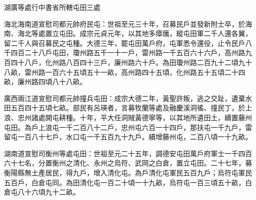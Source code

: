 \begin{pinyinscope}
 湖廣等處行中書省所轄屯田三處



 海北海南道宣慰司都元帥府民屯：世祖至元三十年，召募民戶並發新附士卒，於海南、海北等處置立屯田。成宗元貞元年，以其地多瘴癘，縱屯田軍二千人還各翼，留二千人與召募民之屯種。大德三年，罷屯田萬戶府，屯軍悉令還役，止令民戶八千四百二十八戶屯田，瓊州路五千一十一戶，雷州路一千五百六十六戶，高州路九百四十八戶，化州路八百四十三戶，廉州路六十戶。為田瓊州路二百九十二頃九十八畝，雷州路一百六十五頃五十一畝，高州路四十五頃，化州路五十五頃二十四畝，廉州路四頃八十八畝。



 廣西兩江道宣慰司都元帥撞兵屯田：成宗大德二年，黃聖許叛，逃之交趾，遺棄水田五百四十五頃七畝。部民有呂瑛者，言募牧蘭等處及融慶溪洞徭、撞民丁，於上浪、忠州諸處開屯耕種。十年，平大任洞賊黃德寧等，以其地所遺田土，續置藤州屯田。為戶上浪屯一千二百八十二戶，忠州屯六百一十四戶，那扶屯一千九戶，雷留屯一百八十七戶，水口屯一千五百九十九戶。續增藤州屯，二百八頃一十九畝。



 湖南道宣慰司衡州等處屯田：世祖至元二十五年，調德安屯田萬戶府軍士一千四百六十七名，分置衡州之清化、永州之烏符、武岡之白倉，置立屯田。二十七年，募衡陽縣無土產居民，得九戶，增入清化屯。為戶清化屯軍民五百九戶；烏符屯軍民五百戶，白倉屯同。為田清化屯一百二十頃一十九畝，烏符屯一百三頃五十畝，白倉屯八十六頃九十二畝。



\end{pinyinscope}